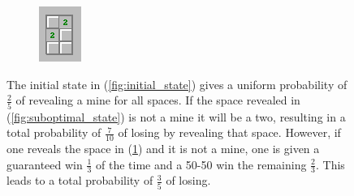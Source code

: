 \documentclass[letterpaper]{article}
\begin{document}
\begin{figure}[t]
\begin{subfigure}[b]{0.3\columnwidth}
	\includegraphics[width=\columnwidth]{tie breaker 3}
	\caption{\label{fig:optimal_state}}
\end{subfigure}
\label{fig:tie_breaker}
\caption{The initial state in (\ref{fig:initial_state}) gives a uniform probability of $\frac25$ of revealing a mine for all spaces.  If the space revealed in (\ref{fig:suboptimal_state}) is not a mine it will be a two, resulting in a total probability of $\frac{7}{10}$ of losing by revealing that space.  However, if one reveals the space in (\ref{fig:optimal_state}) and it is not a mine, one is given a guaranteed win $\frac13$ of the time and a 50-50 win the remaining $\frac23$.  This leads to a total probability of $\frac35$ of losing.}
\end{figure}
\end{document}
